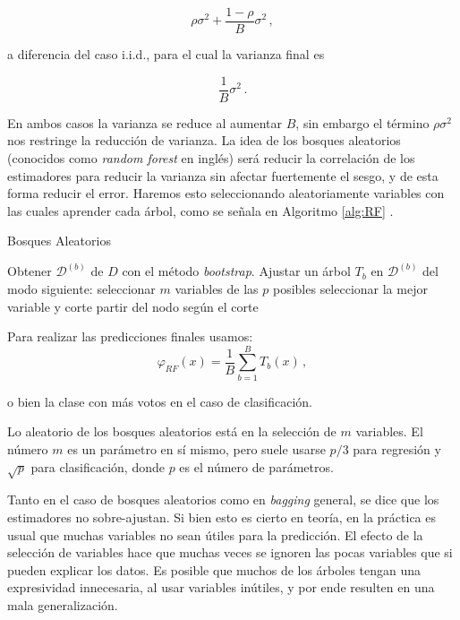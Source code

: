 $$ \rho \sigma^2 + \frac{1 - \rho}{B} \sigma^2 \,, $$

a diferencia del caso i.i.d., para el cual la varianza final es

$$ \frac{1}{B}\sigma^2 \,. $$

En ambos casos la varianza se reduce al aumentar $B$, sin embargo el término $\rho \sigma^2$ nos restringe la reducción de varianza. La idea de los bosques aleatorios (conocidos como \textit{random forest} en inglés) será reducir la correlación de los estimadores para reducir la varianza sin afectar fuertemente el sesgo, y de esta forma reducir el error. Haremos esto seleccionando aleatoriamente variables con las cuales aprender cada árbol, como se señala en Algoritmo \ref{alg:RF} \cite{breiman2001random}.

\begin{algorithm}[H]
  \caption{Bosques Aleatorios
    \label{alg:RF}}
  \begin{algorithmic}[1]
    \State Obtener $\mathcal{D}^{(b)}$ de $D$ con el método \textit{bootstrap}.
    \State Ajustar un árbol $T_b$ en $\mathcal{D}^{(b)}$ del modo siguiente:
            \State seleccionar $m$ variables de las $p$ posibles
            \State seleccionar la mejor variable y corte
            \State partir del nodo según el corte
        \EndFor
    \EndFor
    \EndFunction
  \end{algorithmic}
\end{algorithm}

Para realizar las predicciones finales usamos:
$$ \varphi_{RF}(x) = \frac{1}{B} \sum^B_{b=1} T_b (x) \,, $$

o bien la clase con más votos en el caso de clasificación.

Lo aleatorio de los bosques aleatorios está en la selección de $m$ variables. El número $m$ es un parámetro en sí mismo, pero suele usarse $p/3$ para regresión y $\sqrt{p}$ para clasificación, donde $p$ es el número de parámetros.

Tanto en el caso de bosques aleatorios como en \textit{bagging} general, se dice que los estimadores no sobre-ajustan. Si bien esto es cierto en teoría, en la práctica es usual que muchas variables no sean útiles para la predicción. El efecto de la selección de variables hace que muchas veces se ignoren las pocas variables que si pueden explicar los datos. Es posible que muchos de los árboles tengan una expresividad innecesaria, al usar variables inútiles, y por ende resulten en una mala generalización.


